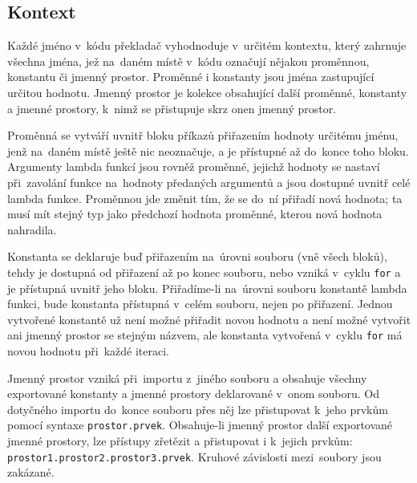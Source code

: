 \documentclass[a4paper,12pt]{article}
\begin{document}
\subsection{Kontext}
Každé jméno v~kódu překladač vyhodnoduje v~určitém kontextu, který zahrnuje všechna jména, jež na~daném místě v~kódu označují nějakou proměnnou, konstantu či jmenný prostor. Proměnné i konstanty jsou jména zastupující určitou hodnotu. Jmenný prostor je kolekce obsahující další proměnné, konstanty a jmenné prostory, k~nimž se přistupuje skrz onen jmenný prostor.

Proměnná se vytváří uvnitř bloku příkazů přiřazením hodnoty určitému jménu, jenž na~daném místě ještě nic neoznačuje, a je přístupné až do~konce toho bloku. Argumenty lambda funkcí jsou rovněž proměnné, jejichž hodnoty se nastaví při~zavolání funkce na~hodnoty předaných argumentů a jsou dostupné uvnitř celé lambda funkce. Proměnnou jde změnit tím, že se do~ní přiřadí nová hodnota; ta musí mít stejný typ jako předchozí hodnota proměnné, kterou nová hodnota nahradila.

Konstanta se deklaruje buď přiřazením na~úrovni souboru (vně všech bloků), tehdy je dostupná od přiřazení až po konec souboru, nebo vzniká v~cyklu \texttt{for} a je přístupná uvnitř jeho bloku. Přiřadíme-li na~úrovni souboru konstantě lambda funkci, bude konstanta přístupná v~celém souboru, nejen po přiřazení. Jednou vytvořené konstantě už není možné přiřadit novou hodnotu a není možné vytvořit ani jmenný prostor se stejným názvem, ale konstanta vytvořená v~cyklu \texttt{for} má novou hodnotu při~každé iteraci.

Jmenný prostor vzniká při~importu z~jiného souboru a obsahuje všechny exportované konstanty a jmenné prostory deklarované v~onom souboru. Od dotyčného importu do~konce souboru přes něj lze přistupovat k~jeho prvkům pomocí syntaxe \texttt{prostor.prvek}. Obsahuje-li jmenný prostor další exportované jmenné prostory, lze přístupy zřetězit a přistupovat i k~jejich prvkům: \texttt{prostor1.prostor2.prostor3.prvek}. Kruhové závislosti mezi~soubory jsou zakázané.
\end{document}
